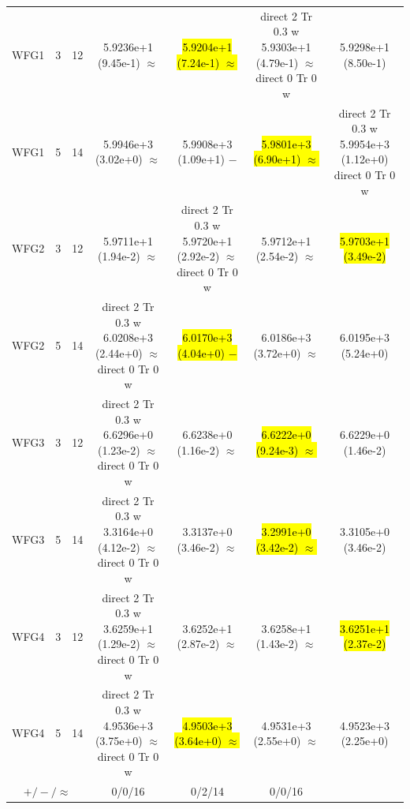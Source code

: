\documentclass[conference]{IEEEtran}
\newcommand{\semitextbf}[1]{%
	\pdfliteral direct {2 Tr 0.3 w} %
	#1%
	\pdfliteral direct {0 Tr 0 w}%
}
\begin{document}
\begin{table}[!t]
\begin{tabular}{ccccccc}
    \hline
    \multirow{1}{*}{WFG1}&3&12&5.9236e+1 (9.45e-1) $\approx$&\hl{5.9204e+1 (7.24e-1) $\approx$}&\semitextbf{5.9303e+1 (4.79e-1) $\approx$}&5.9298e+1 (8.50e-1)\\
    \multirow{1}{*}{WFG1}&5&14&5.9946e+3 (3.02e+0) $\approx$&5.9908e+3 (1.09e+1) $-$&\hl{5.9801e+3 (6.90e+1) $\approx$}&\semitextbf{5.9954e+3 (1.12e+0)}\\
    \multirow{1}{*}{WFG2}&3&12&5.9711e+1 (1.94e-2) $\approx$&\semitextbf{5.9720e+1 (2.92e-2) $\approx$}&5.9712e+1 (2.54e-2) $\approx$&\hl{5.9703e+1 (3.49e-2)}\\
    \multirow{1}{*}{WFG2}&5&14&\semitextbf{6.0208e+3 (2.44e+0) $\approx$}&\hl{6.0170e+3 (4.04e+0) $-$}&6.0186e+3 (3.72e+0) $\approx$&6.0195e+3 (5.24e+0)\\
    \multirow{1}{*}{WFG3}&3&12&\semitextbf{6.6296e+0 (1.23e-2) $\approx$}&6.6238e+0 (1.16e-2) $\approx$&\hl{6.6222e+0 (9.24e-3) $\approx$}&6.6229e+0 (1.46e-2)\\
    \multirow{1}{*}{WFG3}&5&14&\semitextbf{3.3164e+0 (4.12e-2) $\approx$}&3.3137e+0 (3.46e-2) $\approx$&\hl{3.2991e+0 (3.42e-2) $\approx$}&3.3105e+0 (3.46e-2)\\
    \multirow{1}{*}{WFG4}&3&12&\semitextbf{3.6259e+1 (1.29e-2) $\approx$}&3.6252e+1 (2.87e-2) $\approx$&3.6258e+1 (1.43e-2) $\approx$&\hl{3.6251e+1 (2.37e-2)}\\
    \multirow{1}{*}{WFG4}&5&14&\semitextbf{4.9536e+3 (3.75e+0) $\approx$}&\hl{4.9503e+3 (3.64e+0) $\approx$}&4.9531e+3 (2.55e+0) $\approx$&4.9523e+3 (2.25e+0)\\
    \hline
    \multicolumn{3}{c}{$+/-/\approx$}&0/0/16&0/2/14&0/0/16&\\
    \bottomrule
    \end{tabular}
\end{table}
\end{document}
